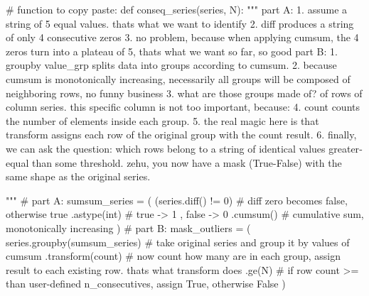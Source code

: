 \documentclass[
  letterpaper,
  DIV=11,
  numbers=noendperiod,
  oneside]{scrreprt}
\newenvironment{Shaded}{\begin{snugshade}}{\end{snugshade}}
\newcommand{\CommentTok}[1]{\textcolor[rgb]{0.37,0.37,0.37}{#1}}
\newcommand{\DecValTok}[1]{\textcolor[rgb]{0.68,0.00,0.00}{#1}}
\newcommand{\KeywordTok}[1]{\textcolor[rgb]{0.00,0.23,0.31}{#1}}
\newcommand{\NormalTok}[1]{\textcolor[rgb]{0.00,0.23,0.31}{#1}}
\newcommand{\OperatorTok}[1]{\textcolor[rgb]{0.37,0.37,0.37}{#1}}
\newcommand{\StringTok}[1]{\textcolor[rgb]{0.13,0.47,0.30}{#1}}
\begin{document}
\begin{Shaded}
\begin{Highlighting}[]
\CommentTok{\# function to copy paste:}
\KeywordTok{def}\NormalTok{ conseq\_series(series, N):}
    \CommentTok{"""}
\CommentTok{    part A:}
\CommentTok{    1. assume a string of 5 equal values. that\textquotesingle{}s what we want to identify}
\CommentTok{    2. diff produces a string of only 4 consecutive zeros}
\CommentTok{    3. no problem, because when applying cumsum, the 4 zeros turn into a plateau of 5, that\textquotesingle{}s what we want}
\CommentTok{    so far, so good}
\CommentTok{    part B:}
\CommentTok{    1. groupby value\_grp splits data into groups according to cumsum.}
\CommentTok{    2. because cumsum is monotonically increasing, necessarily all groups will be composed of neighboring rows, no funny business}
\CommentTok{    3. what are those groups made of? of rows of column \textquotesingle{}series\textquotesingle{}. this specific column is not too important, because:}
\CommentTok{    4. count \textquotesingle{}counts\textquotesingle{} the number of elements inside each group.}
\CommentTok{    5. the real magic here is that \textquotesingle{}transform\textquotesingle{} assigns each row of the original group with the count result.}
\CommentTok{    6. finally, we can ask the question: which rows belong to a string of identical values greater{-}equal than some threshold.}
\CommentTok{    zehu, you now have a mask (True{-}False) with the same shape as the original series.}

\CommentTok{    """}
    \CommentTok{\# part A:}
\NormalTok{    sumsum\_series }\OperatorTok{=}\NormalTok{ (}
\NormalTok{                   (series.diff() }\OperatorTok{!=} \DecValTok{0}\NormalTok{)         }\CommentTok{\# diff zero becomes false, otherwise true}
\NormalTok{                      .astype(}\StringTok{\textquotesingle{}int\textquotesingle{}}\NormalTok{)           }\CommentTok{\# true {-}\textgreater{} 1  , false {-}\textgreater{} 0}
\NormalTok{                      .cumsum()                }\CommentTok{\# cumulative sum, monotonically increasing}
\NormalTok{                  )}
    \CommentTok{\# part B:}
\NormalTok{    mask\_outliers }\OperatorTok{=}\NormalTok{ (}
\NormalTok{                    series.groupby(sumsum\_series)           }\CommentTok{\# take original series and group it by values of cumsum}
\NormalTok{                                .transform(}\StringTok{\textquotesingle{}count\textquotesingle{}}\NormalTok{)        }\CommentTok{\# now count how many are in each group, assign result to each existing row. that\textquotesingle{}s what transform does}
\NormalTok{                                .ge(N)                    }\CommentTok{\# if row count \textgreater{}= than user{-}defined n\_consecutives, assign True, otherwise False}
\NormalTok{                    )}
    

\end{Highlighting}
\end{Shaded}
\end{document}

